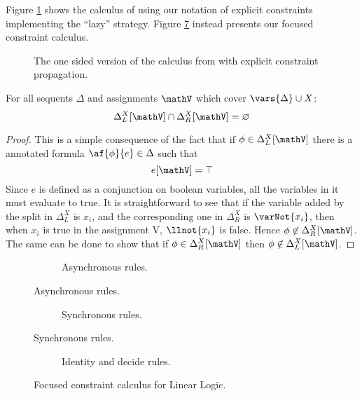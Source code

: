 Figure \ref{fig:hp calculus} shows the calculus of \cite{HarlandPym} using our notation of explicit constraints implementing the ``lazy'' strategy.
Figure \ref{fig:calculus} instead presents our focused constraint calculus.
\begin{figure}[h!]
	\centering
	
	\caption{The one sided version of the calculus from \cite{HarlandPym} with explicit constraint propagation.\label{fig:hp calculus}}
\end{figure}
\begin{lemma}
	\label{lemma:cap}
	For all sequents $\Delta$ and assignments $\mathV$ which cover $\vars{\Delta} \cup X$:
	$$ \Delta_L^X[\mathV] \cap \Delta_R^X[\mathV] = \varnothing $$
\end{lemma}
\begin{proof}
	This is a simple consequence of the fact that if $\phi \in \Delta_L^X[\mathV]$ there is a annotated formula $\af{\phi}{e} \in \Delta$ such that 
	$$ e[\mathV] = \top $$
	Since $e$ is defined as a conjunction on boolean variables, all the variables in it must evaluate to true.
	It is straightforward to see that if the variable added by the split in $\Delta_L^X$ is $x_i$, and the corresponding one in $\Delta_R^X$ is $\varNot{x_i}$, then when $x_i$ is true in the assignment V, $\llnot{x_i}$ is false.
	Hence $\phi \not \in \Delta_R^X[\mathV]$.
	The same can be done to show that if $\phi \in \Delta_R^X[\mathV]$ then $\phi \not \in \Delta_L^X[\mathV]$.
\end{proof}
\begin{figure}[H]
	\begin{subfigure}{\textwidth}
		\centering
		
		\caption{Asynchronous rules.\label{fig:asy calculus}}
	\end{subfigure}
\end{figure}
\begin{figure}[H]
	\ContinuedFloat
	\begin{subfigure}{\textwidth}
		\centering
		
		\caption{Synchronous rules.\label{fig:sync calculus}}
	\end{subfigure}
\end{figure}
\begin{figure}[H]
	\ContinuedFloat
	\begin{subfigure}{\textwidth}
		\centering
		
		\caption{Identity and decide rules.\label{fig:id dec calculus}}
	\end{subfigure}
	\caption{Focused constraint calculus for Linear Logic. \label{fig:calculus}}
\end{figure}

